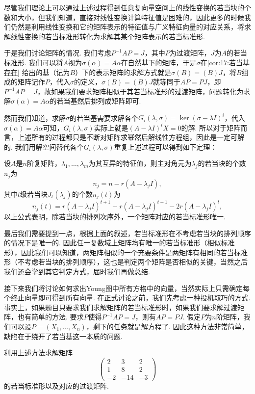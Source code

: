 尽管我们理论上可以通过上述过程得到任意复向量空间上的线性变换的若当块的个数和大小，但我们知道，直接对线性变换计算特征值是困难的，因此更多的时候我们仍然是利用线性变换和它的矩阵表示的特征值与广义特征向量的对应关系，将求解线性变换的若当标准形转化为求解其某个矩阵表示的若当标准形.

于是我们讨论矩阵的情况. 我们考虑$P^{-1}AP=J$，其中$P$为过渡矩阵，$J$为$A$的若当标准形. 我们可以将$A$视为$\sigma(\alpha)=A\alpha$在自然基下的矩阵，于是$\sigma$在\autoref{cor:17:若当基存在} 给出的基（记为$B$）下的表示矩阵的求解方式就是$\sigma(B)=(B)J$，将$B$组成的矩阵记作$P$，代入$\sigma$的定义，$\sigma(B)=(B)J$就等同于$AP=PJ$，即$P^{-1}AP=J$，故如果我们要求矩阵相似于其若当标准形的过渡矩阵，问题转化为求解$\sigma(\alpha)=A\alpha$的若当基然后排列成矩阵即可.

然而我们知道，求解$\sigma$的若当基需要求解各个$G_i(\lambda,\sigma)=\ker(\sigma-\lambda I)^i$，代入$\sigma(\alpha)=A\alpha$可知，$G_i(\lambda,\sigma)$实际上就是$(A-\lambda I)^iX=0$的解. 所以对于矩阵而言，上述所有的过程都只是不断对矩阵求幂然后解线性方程组，因此是一定可解的. 我们用解空间替代各个$G_i(\lambda,\sigma)$重复上述过程可以得到如下定理：
\begin{theorem}
    设$A$是$n$阶复矩阵，$\lambda_1,\ldots,\lambda_m$为其互异的特征值，则主对角元为$\lambda_j$的若当块的个数$n_j$为
    \begin{equation} \label{eq:17:矩阵若当块个数}
        n_j=n-r(A-\lambda_j I),
    \end{equation}
    其中$t$级若当块$J_t(\lambda_j)$的个数$n_j(t)$为
    \begin{equation} \label{eq:17:矩阵若当块大小}
        n_j(t)=r(A-\lambda_j I)^{t+1}+r(A-\lambda_j I)^{t-1}-2r(A-\lambda_j I)^t,
    \end{equation}
    以上公式表明，除若当块的排列次序外，一个矩阵对应的若当标准形唯一.
\end{theorem}

最后我们需要提到一点，根据上面的叙述，若当标准形在不考虑若当块的排列顺序的情况下是唯一的. 因此任一复数域上矩阵均有唯一的若当标准形（相似标准形），因此我们可以知道，两矩阵相似的一个充要条件是两矩阵有相同的若当标准形（不考虑若当块的排列顺序），这也是判定两个矩阵是否相似的关键，当然之后我们还会学到其它判定方式，届时我们再做总结.

接下来我们将讨论如何求出Young图中所有方格中的向量，当然实际上只需确定每个终止向量即可得到所有向量. 在正式讨论之前，我们先考虑一种投机取巧的方式. 事实上，如果题目只要求我们求解矩阵的若当标准形时，如果我们要求解过渡矩阵，也有简单的方法. 要求$P$使得$P^{-1}AP=J$，则有$AP=PJ$. 假定$P$为$n$阶矩阵，我们可以设$P=(X_1,\ldots,X_n)$，剩下的任务就是解方程了. 因此这种方法非常简单，缺陷在于绕开了若当基这一本质的问题.
\begin{example}
    利用上述方法求解矩阵\[\begin{pmatrix}
        2 & 3 & 2 \\ 1 & 8 & 2 \\ -2 & -14 & -3
    \end{pmatrix}\]的若当标准形以及对应的过渡矩阵.
\end{example}

